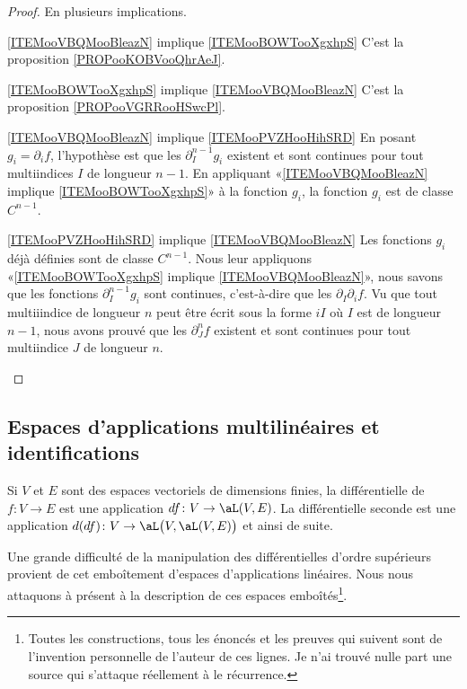\begin{proof}
    En plusieurs implications.
    \begin{subproof}
        \item[\ref{ITEMooVBQMooBleazN} implique \ref{ITEMooBOWTooXgxhpS}]
            C'est la proposition \ref{PROPooKOBVooQhrAeJ}.
        \item[\ref{ITEMooBOWTooXgxhpS} implique \ref{ITEMooVBQMooBleazN}]
            C'est la proposition \ref{PROPooVGRRooHSwcPl}.
        \item[\ref{ITEMooVBQMooBleazN} implique \ref{ITEMooPVZHooHihSRD}]
            En posant \( g_i=\partial_if\), l'hypothèse est que les \( \partial^{n-1}_Ig_i\) existent et sont continues pour tout multiindices \( I\) de longueur \( n-1\). En appliquant «\ref{ITEMooVBQMooBleazN} implique \ref{ITEMooBOWTooXgxhpS}» à la fonction \( g_i\), la fonction \( g_i\) est de classe \( C^{n-1}\).
        \item[\ref{ITEMooPVZHooHihSRD} implique \ref{ITEMooVBQMooBleazN}]
            Les fonctions \( g_i\) déjà définies sont de classe \( C^{n-1}\). Nous leur appliquons «\ref{ITEMooBOWTooXgxhpS} implique \ref{ITEMooVBQMooBleazN}», nous savons que les fonctions \( \partial^{n-1}_Ig_i\) sont continues, c'est-à-dire que les \( \partial_I\partial_if\). Vu que tout multiiindice de longueur \( n\) peut être écrit sous la forme \( iI\) où \( I\) est de longueur \( n-1\), nous avons prouvé que les \( \partial^n_Jf\) existent et sont continues pour tout multiindice \( J\) de longueur \( n\).
    \end{subproof}
\end{proof}

\subsection{Espaces d'applications multilinéaires et identifications}

Si \( V\) et \( E\) sont des espaces vectoriels de dimensions finies, la différentielle de \( f\colon V\to E\) est une application \( df\colon V\to \aL(V,E)\). La différentielle seconde est une application \( d(df)\colon V\to \aL\big( V,\aL(V,E) \big)\) et ainsi de suite.

Une grande difficulté de la manipulation des différentielles d'ordre supérieurs provient de cet emboîtement d'espaces d'applications linéaires. Nous nous attaquons à présent à la description de ces espaces emboîtés\footnote{Toutes les constructions, tous les énoncés et les preuves qui suivent sont de l'invention personnelle de l'auteur de ces lignes. Je n'ai trouvé nulle part une source qui s'attaque réellement à le récurrence.}.

